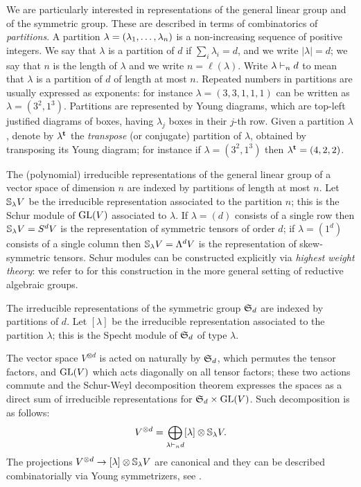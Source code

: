 We are particularly interested in representations of the general linear group and of the symmetric group. These are described in terms of combinatorics of \emph{partitions}. A partition $\lambda = (\lambda_1 , \ldots , \lambda_n)$ is a non-increasing sequence of positive integers. We say that $\lambda$ is a partition of $d$ if $\sum_i \lambda_i = d$, and we write $|\lambda| = d$; we say that $n$ is the length of $\lambda$ and we write $n = \ell(\lambda)$. Write $\lambda \vdash_n d$ to mean that $\lambda$ is a partition of $d$ of length at most $n$. Repeated numbers in partitions are usually expressed as exponents: for instance $\lambda= (3,3,1,1,1)$ can be written as $\lambda = (3^2,1^3)$. Partitions are represented by Young diagrams, which are top-left justified diagrams of boxes, having $\lambda_j$ boxes in their $j$-th row. Given a partition $\lambda$, denote by $\lambda^{\mathbf{t}}$ the \emph{transpose} (or conjugate) partition of $\lambda$, obtained by transposing its Young diagram; for instance if $\lambda = (3^2,1^3)$ then $\lambda^{\mathbf{t}} = (4,2,2)$. 

The (polynomial) irreducible representations of the general linear group of a vector space of dimension $n$ are indexed by partitions of length at most $n$. Let $\mathbb{S}_\lambda V$ be the irreducible representation associated to the partition $n$; this is the Schur module of $\mathrm{GL}(V)$ associated to $\lambda$. If $\lambda = (d)$ consists of a single row then $\mathbb{S}_\lambda V = S^d V$ is the representation of symmetric tensors of order $d$; if $\lambda = (1^d)$ consists of a single column then $\mathbb{S}_\lambda V = \Lambda^d V$ is the representation of skew-symmetric tensors. Schur modules can be constructed explicitly via \emph{highest weight theory}: we refer to \cite{FH91} for this construction in the more general setting of reductive algebraic groups.

The irreducible representations of the symmetric group $\mathfrak{S}_d$ are indexed by partitions of $d$. Let $[\lambda]$ be the irreducible representation associated to the partition $\lambda$; this is the Specht module of $\mathfrak{S}_d$ of type $\lambda$. 

The vector space $V^{\otimes d}$ is acted on naturally by $\mathfrak{S}_d$, which permutes the tensor factors, and $\mathrm{GL}(V)$ which acts diagonally on all tensor factors; these two actions commute and the Schur-Weyl decomposition theorem expresses the spaces as a direct sum of irreducible representations for $\mathfrak{S}_d \times \mathrm{GL}(V)$. Such decomposition is as follows:
\[
V^{\otimes d} = \bigoplus_{\lambda \vdash_n d} [\lambda] \otimes \mathbb{S}_{\lambda} V.
\]
The projections $V^{\otimes d} \to [\lambda] \otimes \mathbb{S}_\lambda V$ are canonical and they can be described combinatorially via Young symmetrizers, see \cite[Lecture 4]{FH91}.

